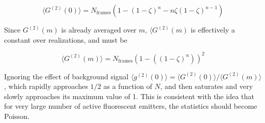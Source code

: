 \documentclass[a4paper, twocolumn, superscriptaddress,prl]{revtex4}  %
\begin{document}
\begin{equation}
\langle G^{(2)}(0)\rangle = N_{\mathrm{frames}}(1 - (1-\zeta)^n - n\zeta (1-\zeta)^{n-1})
\end{equation}

Since $G^{(2)}(m)$ is already averaged over $m$, $\langle G^{(2)}(m) $ is effectively a constant over realizations, and must be

\begin{equation}
\langle G^{(2)}(m)\rangle =  N_{\mathrm{frames}} \left(1 - \left((1-\zeta)^n\right)\right)^2
\end{equation}

Ignoring the effect of background signal $\langle g^{(2)}(0)\rangle =\langle G^{(2)}(0)\rangle/\langle G^{(2)}(m)\rangle$, which rapidly approaches $1/2$ as a function of $N$, and then saturates and very slowly approaches its maximum value of 1. This is consistent with the idea that for very large number of active fluorescent emitters, the statistics should become Poisson.


 
\end{document}
